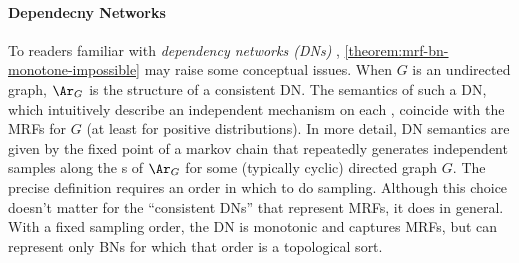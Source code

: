 \begin{subappendices}
\paragraph{Dependecny Networks}
To readers familiar with \emph{dependency networks (DNs)} \citep{heckerman2000dependency},
\cref{theorem:mrf-bn-monotone-impossible} may raise some conceptual issues.
When $G$ is an undirected graph, $\Ar_G$ is the structure of a consistent DN.
The semantics of such a DN,
which intuitively describe an independent mechanism on each \arc,
coincide with the MRFs for $G$ (at least for positive distributions). 
In more detail, DN semantics are given by the fixed point of a markov chain that repeatedly generates independent samples along the \arc s of $\Ar_G$ for some (typically cyclic) directed graph $G$. The precise definition requires an order in which to do sampling. Although this choice doesn't matter for the ``consistent DNs'' that represent MRFs, it does in general. With a fixed sampling order, the DN is monotonic and captures MRFs, but can represent only BNs for which that order is a topological sort.


\end{subappendices}

